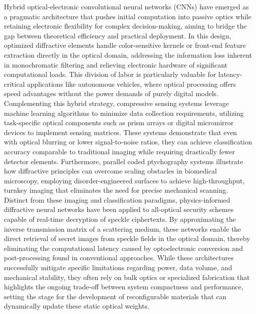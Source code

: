 Hybrid optical-electronic convolutional neural networks (CNNs) have emerged as a pragmatic architecture that pushes initial computation into passive optics while retaining electronic flexibility for complex decision-making, aiming to bridge the gap between theoretical efficiency and practical deployment. In this design, optimized diffractive elements handle color-sensitive kernels or front-end feature extraction directly in the optical domain, addressing the information loss inherent in monochromatic filtering and relieving electronic hardware of significant computational loads. This division of labor is particularly valuable for latency-critical applications like autonomous vehicles, where optical processing offers speed advantages without the power demands of purely digital models. Complementing this hybrid strategy, compressive sensing systems leverage machine learning algorithms to minimize data collection requirements, utilizing task-specific optical components such as prism arrays or digital micromirror devices to implement sensing matrices. These systems demonstrate that even with optical blurring or lower signal-to-noise ratios, they can achieve classification accuracy comparable to traditional imaging while requiring drastically fewer detector elements. Furthermore, parallel coded ptychography systems illustrate how diffractive principles can overcome scaling obstacles in biomedical microscopy, employing disorder-engineered surfaces to achieve high-throughput, turnkey imaging that eliminates the need for precise mechanical scanning. Distinct from these imaging and classification paradigms, physics-informed diffractive neural networks have been applied to all-optical security schemes capable of real-time decryption of speckle ciphertexts. By approximating the inverse transmission matrix of a scattering medium, these networks enable the direct retrieval of secret images from speckle fields in the optical domain, thereby eliminating the computational latency caused by optoelectronic conversion and post-processing found in conventional approaches. While these architectures successfully mitigate specific limitations regarding power, data volume, and mechanical stability, they often rely on bulk optics or specialized fabrication that highlights the ongoing trade-off between system compactness and performance, setting the stage for the development of reconfigurable materials that can dynamically update these static optical weights. \citep{doi_10_1038_s41598_018_30619_y_5f5bfb09} \citep{doi_10_1117_1_oe_59_5_051404_363a991a} \citep{doi_10_1021_acsphotonics_1c01085_479fdea3} \citep{doi_10_1117_1_apn_5_1_016010_3e30c230}

